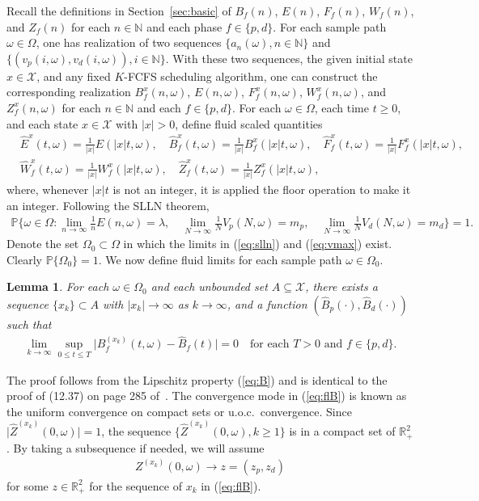 \documentclass[11pt]{article}
\theoremstyle{plain}
\newtheorem{lemma}[theorem]{Lemma}
\theoremstyle{definition}
\theoremstyle{remark}
\newcommand{\R}{\mathbb{R}}
\newcommand{\N}{\mathbb{N}}
\newcommand{\Prob}{\mathbb{P}}
\providecommand{\abs}[1]{\lvert#1\rvert}
\begin{document}
Recall the definitions in
Section~\ref{sec:basic} of $B_f(n)$, $E(n)$, $F_f(n)$, $W_f(n)$, and
$Z_f(n)$ for each $n\in\N$ and each phase $f\in \{p, d\}$.  For each
sample path $\omega\in \Omega$, one has realization of two sequences
$\{a_n(\omega),n\in\N\}$ and
$\{(v_p(i,\omega), v_d(i,\omega)), i\in\N\}$. With these two
sequences, the given initial state $x\in \mathcal{X}$, and any fixed
$K$-FCFS scheduling algorithm, one can construct the corresponding
realization  $B^x_f(n,\omega)$, $E(n, \omega)$, $F^x_f(n,\omega)$, $W^x_f(n,\omega)$, and
$Z^x_f(n,\omega)$ for each $n\in\N$ and each $f\in \{p,d\}$. For each $\omega\in \Omega$, each time $t\ge 0$, and each state $x\in \mathcal{X}$ with $\abs{x}>0$, define fluid scaled quantities
\begin{align*}
&  \hat E^x(t, \omega)=\frac{1}{\abs{x}} E(\abs{x}t, \omega), \quad
  \hat B^x_f(t, \omega)=\frac{1}{\abs{x}} B^x_f(\abs{x}t, \omega), \quad
 \hat F^x_f(t, \omega)=\frac{1}{\abs{x}} F^x_f(\abs{x}t, \omega),\\
&  \hat W^x_f(t, \omega)=\frac{1}{\abs{x}} W^x_f(\abs{x}t, \omega),\quad
  \hat Z^x_f(t, \omega)=\frac{1}{\abs{x}} Z^x_f(\abs{x}t, \omega),
\end{align*}
where, whenever $\abs{x}t$ is not an integer, it is applied
the floor operation to make it an integer.
Following the SLLN theorem,
\begin{align}\label{eq:slln}
  \Prob\Big\{\omega\in \Omega: \lim_{n\to\infty}\frac{1}{n} E(n, \omega) =\lambda, \quad  \lim_{N\to\infty} \frac{1}{N} V_p(N,\omega)=m_p, \quad
   \lim_{N\to\infty} \frac{1}{N} V_d(N,\omega)=m_d\Big\} =1.
\end{align}
Denote the set $\Omega_0\subset \Omega$ in which the limits in (\ref{eq:slln})
and (\ref{eq:vmax}) exist. Clearly $\Prob\{\Omega_0\}=1$. We now define fluid limits for each
sample path $\omega\in \Omega_0$.
\begin{lemma}
  For each $\omega\in \Omega_0$ and each unbounded set $A \subseteq \mathcal{X}$, there exists a sequence $\{x_k\}\subset A$ with $\abs{x_k}\to\infty$ as $k\to\infty$, and  a function $(\hat B_p(\cdot), \hat B_d(\cdot))$ such that
  \begin{align}
    \label{eq:flB}
    \lim_{k\to\infty} \sup_{0\le t\le T} \abs{B^{(x_k)}_f(t,\omega)-\hat{B}_f(t)} = 0
    \quad \text{for each } T>0 \text{ and } f\in \{p,d\}.
  \end{align}
\end{lemma}
The proof follows from the Lipschitz property (\ref{eq:B}) and is identical to the proof of (12.37) on page 285 of~\citep{dai2020processing}. The
convergence mode in  (\ref{eq:flB}) is known as the uniform convergence on compact sets or u.o.c.\ convergence. Since $\abs{\hat Z^{(x_k)}(0,\omega)}=1$,
the sequence $\{\hat Z^{(x_k)}(0,\omega), k\ge 1\}$ is in a compact set of $\R^2_+$. By taking a subsequence if needed,  we will assume 
\begin{align}
  \label{eq:initial}
  Z^{(x_k)}(0, \omega) \to z=(z_p, z_d)
\end{align}
for some $z\in \R^2_+$ for the sequence of $x_k$ in (\ref{eq:flB}).
\end{document}
